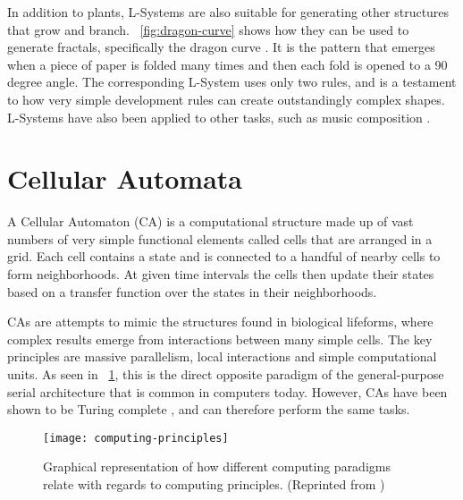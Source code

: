 In addition to plants, L-Systems are also suitable for generating other structures that grow and branch.
\figurename~\ref{fig:dragon-curve} shows how they can be used to generate fractals, specifically the dragon curve \cite{gardner1967heighway}.
It is the pattern that emerges when a piece of paper is folded many times and then each fold is opened to a 90 degree angle.
The corresponding L-System uses only two rules, and is a testament to how very simple development rules can create outstandingly complex shapes.
L-Systems have also been applied to other tasks, such as music composition \cite{manousakis2006musical}.


\section{Cellular Automata}

A Cellular Automaton (CA) is a computational structure made up of vast numbers of very simple functional elements called cells that are arranged in a grid.
Each cell contains a state and is connected to a handful of nearby cells to form neighborhoods.
At given time intervals the cells then update their states based on a transfer function over the states in their neighborhoods.\footnotemark


CAs are attempts to mimic the structures found in biological lifeforms, where complex results emerge from interactions between many simple cells.
The key principles are massive parallelism, local interactions and simple computational units.
As seen in \figurename~\ref{fig:computing-principles}, this is the direct opposite paradigm of the general-purpose serial architecture that is common in computers today.
However, CAs have been shown to be Turing complete \cite{codd1968cellular, neumann1966selfreplication}, and can therefore perform the same tasks.

\begin{figure}[!ht]
    \centering
    \texttt{[image: computing-principles]}
    \caption[Computing principles]{
        Graphical representation of how different computing paradigms relate with regards to computing principles.
        (Reprinted from \cite{sipper1999emergence})
    }
    \label{fig:computing-principles}
\end{figure}

